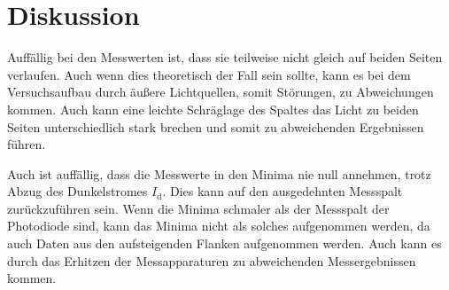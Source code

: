 \section{Diskussion}

Auffällig bei den Messwerten ist, dass sie teilweise nicht gleich auf beiden Seiten verlaufen. Auch wenn dies theoretisch der Fall sein sollte, kann es bei dem Versuchsaufbau  durch äußere Lichtquellen, somit Störungen, zu Abweichungen kommen. Auch kann eine leichte Schräglage des Spaltes das Licht zu beiden Seiten unterschiedlich stark brechen und somit zu abweichenden Ergebnissen führen. 

Auch ist auffällig, dass die Messwerte in den Minima nie null annehmen, trotz Abzug des Dunkelstromes $I_\text{d}$. Dies kann auf den ausgedehnten Messspalt zurückzuführen sein. Wenn die Minima schmaler als der Messspalt der Photodiode sind, kann das Minima nicht als solches aufgenommen werden, da auch Daten aus den aufsteigenden Flanken aufgenommen werden. 
Auch kann es durch das Erhitzen der Messapparaturen zu abweichenden Messergebnissen kommen.